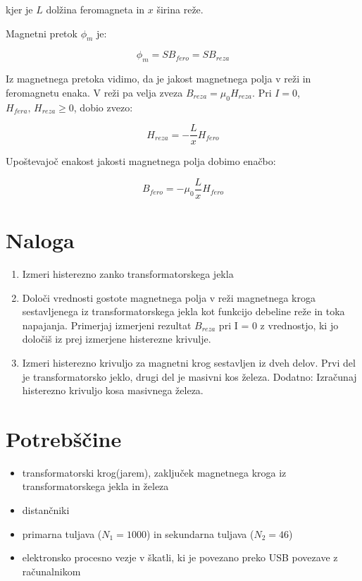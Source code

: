 \documentclass[12pt]{report}
\begin{document}
kjer je $L$ dolžina feromagneta in $x$ širina reže. 

Magnetni pretok $\phi_m$ je:

\begin{equation}
  \phi_m = SB_{fero} = SB_{reza}
\end{equation}

Iz magnetnega pretoka vidimo, da je jakost magnetnega polja v reži in feromagnetu enaka. V reži pa velja zveza $B_{reza} = \mu_0 H_{reza}$. Pri $I = 0$, $H_{fera}\text{, } H_{reza} \geq 0$, dobio zvezo: 

\begin{equation}
  H_{reza} = -\frac{L}{x} H_{fero} 
\end{equation}

Upoštevajoč enakost jakosti magnetnega polja dobimo enačbo: 

\begin{equation}
  B_{fero} = - \mu_0 \frac{L}{x} H_{fero}
\end{equation}

\chapter*{Naloga}

\begin{enumerate}
  \item Izmeri histerezno zanko transformatorskega jekla
  \item Določi vrednosti gostote magnetnega polja v reži magnetnega kroga sestavljenega iz transformatorskega jekla kot funkcijo debeline reže in toka napajanja. Primerjaj izmerjeni rezultat $B_{reza}$ pri I = 0 z vrednostjo, ki jo določiš iz prej izmerjene histerezne krivulje. 
  \item Izmeri histerezno krivuljo za magnetni krog sestavljen iz dveh delov. Prvi del je transformatorsko jeklo, drugi del je masivni kos železa. Dodatno: Izračunaj histerezno krivuljo kosa masivnega železa. 
\end{enumerate}


\begingroup
\let\clearpage\relax

\chapter*{Potrebščine}
\begin{itemize}
  \item transformatorski krog(jarem), zaključek magnetnega kroga iz transformatorskega jekla in železa
  \item distančniki 
  \item primarna tuljava ($N_1 = 1000$) in sekundarna tuljava ($N_2 = 46$)
  \item elektronsko procesno vezje v škatli, ki je povezano preko USB povezave z računalnikom 
\end{itemize}
\end{document}
